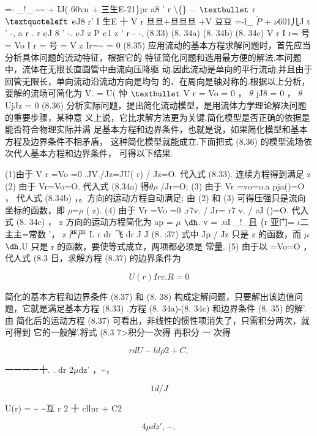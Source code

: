 =- \_!\_ \textasciitilde{}\textasciitilde{} + IJ( 60vn + 三生E-21\}pr a8 ' r \textbackslash\{\} --. ${\rm •}$ r${\rm ‘}$ ${\rm e}$J8 r' I 生E 十 V r 旦旦+旦旦旦 +V 豆豆 =-l\_ $\tilde{P}$ + $\nu$601儿J t ' -, a r . r ${\rm e}$J 8 ' -. ${\rm e}$J z P ${\rm e}$1 z ' r - -, (8.33) (8. 34a) (8. 34b) (8. 34c) V r I r= 号 = Vo I r = 号 = V z Ir=\textasciitilde{} = 0 (8.35) 应用流动的基本方程求解问题时，首先应当分析具体问题的流动特征，根据它的 特征简化问题和选用最方便的解法.本问题中，流体在无限长直圆管中由流向压降驱 动.因此流动是单向的平行流动;并且由于回管无限长，单向流动沿流动方向是均匀 的、在周向是轴对称的.根据以上分析，要解的流场可简化为 V. = U( 忡 ${\rm •}$ V r = Vo = 0 ， $\theta$ jJ8 = 0 ， $\theta$ UjJz = 0 (8.36) 分析实际问题，提出简化流动模型，是用流体力学理论解决问题的重要步骤，某种意 义上说，它比求解方法更为关键.简化模型是否正确的依据是能否符合物理实际并满 足基本方程和边界条件，也就是说，如果简化模型和基本方程及边界条件不相矛盾， 这种简化模型就能成立.下面把式 (8.36) 的模型流场依次代人基本方程和边界条件， 可得以下结果.

(1)由于 V r =Vo =0 .JV./Jz=JU( r) / Jz=O. 代入式 (8.33). 连续方程得到满足 z (2) 由于 Vr=Vo=O. 代入式 (8.34a) 得$\theta$$\rho$ /Jr=O; (3) 由于 Vr =vo=o.a pja()=O ， 代人式 (8.34b) ，。方向的运动方程自动满足; 由 (2) 和 (3) 可得压强只是流向坐标的函数，即 $\rho$=$\rho$ ( z). (4) 由于 Vr =Vo =0 ,r7v. / Jr= r7 v. / cJ ()=O. 代入式 (8. 34c) ， z 方向的运动方程简化为 ap = $\mu$ ${\rm ð}$. v = .uI \_!\_且 \{r 亚门= $\iota$二主主=常数 '， z 严严 L r dr 飞 dr J J (8. :37) 式中 Jp / Jz 只是 z 的函数，而 $\mu$ ${\rm ð}$.U 只是 r 的函数，要使等式成立，两项都必须是 常量. (5) 由于以 =Vo=O ， 代人式 (8.3 日，求解方程 (8.37) 的边界条件为

\begin{equation*}U(r) I r c. R = 0\tag{8.38}\end{equation*}

简化的基本方程和边界条件 (8.37) 和 (8. 38) 构成定解问题，只要解出该边值问 题，它就是满足基本方程 (8.33) .方程 (8. 34a)-(8. 34c) 和边界条件 (8. 35) 的解'.由 简化后的运动方程 (8.37) 可看出，非线性的惯性项消失了，只需积分两次，就可得到 它的一般解'.将式 (8.3 7>积分一次得 再积分 一 次得

\[r dU-l d\rho  2 +C,\]

一一一一十. . dr 2$\mu$dz' ，\textasciitilde{}，

\[1 d /J\]

U(r) = \textasciitilde{} \textasciitilde{}互 r 2 十 cllnr + C2

\[4\mu dz' , -,\]

